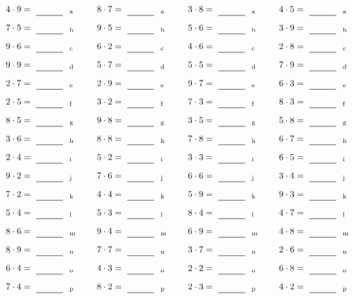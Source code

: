 \documentclass
[
  draft    = true,
  fontsize = 11pt,
  parskip  = half-
]
{scrartcl}
\begin{document}
\par\vfill\par
\begin{align*}
    \pline{4\cdot9}&=\rline{a}
  & \pline{8\cdot7}&=\rline{a}
  & \pline{3\cdot8}&=\rline{a}
  & \pline{4\cdot5}&=\rline{a} \\[1ex]
    \pline{7\cdot5}&=\rline{b}
  & \pline{9\cdot5}&=\rline{b}
  & \pline{5\cdot6}&=\rline{b}
  & \pline{3\cdot9}&=\rline{b} \\[1ex]
    \pline{9\cdot6}&=\rline{c}
  & \pline{6\cdot2}&=\rline{c}
  & \pline{4\cdot6}&=\rline{c}
  & \pline{2\cdot8}&=\rline{c} \\[1ex]
    \pline{9\cdot9}&=\rline{d}
  & \pline{5\cdot7}&=\rline{d}
  & \pline{5\cdot5}&=\rline{d}
  & \pline{7\cdot9}&=\rline{d} \\[1ex]
    \pline{2\cdot7}&=\rline{e}
  & \pline{2\cdot9}&=\rline{e}
  & \pline{9\cdot7}&=\rline{e}
  & \pline{6\cdot3}&=\rline{e} \\[1ex]
    \pline{2\cdot5}&=\rline{f}
  & \pline{3\cdot2}&=\rline{f}
  & \pline{7\cdot3}&=\rline{f}
  & \pline{8\cdot3}&=\rline{f} \\[1ex]
    \pline{8\cdot5}&=\rline{g}
  & \pline{9\cdot8}&=\rline{g}
  & \pline{3\cdot5}&=\rline{g}
  & \pline{5\cdot8}&=\rline{g} \\[1ex]
    \pline{3\cdot6}&=\rline{h}
  & \pline{8\cdot8}&=\rline{h}
  & \pline{7\cdot8}&=\rline{h}
  & \pline{6\cdot7}&=\rline{h} \\[1ex]
    \pline{2\cdot4}&=\rline{i}
  & \pline{5\cdot2}&=\rline{i}
  & \pline{3\cdot3}&=\rline{i}
  & \pline{6\cdot5}&=\rline{i} \\[1ex]
    \pline{9\cdot2}&=\rline{j}
  & \pline{7\cdot6}&=\rline{j}
  & \pline{6\cdot6}&=\rline{j}
  & \pline{3\cdot4}&=\rline{j} \\[1ex]
    \pline{7\cdot2}&=\rline{k}
  & \pline{4\cdot4}&=\rline{k}
  & \pline{5\cdot9}&=\rline{k}
  & \pline{9\cdot3}&=\rline{k} \\[1ex]
    \pline{5\cdot4}&=\rline{l}
  & \pline{5\cdot3}&=\rline{l}
  & \pline{8\cdot4}&=\rline{l}
  & \pline{4\cdot7}&=\rline{l} \\[1ex]
    \pline{8\cdot6}&=\rline{m}
  & \pline{9\cdot4}&=\rline{m}
  & \pline{6\cdot9}&=\rline{m}
  & \pline{4\cdot8}&=\rline{m} \\[1ex]
    \pline{8\cdot9}&=\rline{n}
  & \pline{7\cdot7}&=\rline{n}
  & \pline{3\cdot7}&=\rline{n}
  & \pline{2\cdot6}&=\rline{n} \\[1ex]
    \pline{6\cdot4}&=\rline{o}
  & \pline{4\cdot3}&=\rline{o}
  & \pline{2\cdot2}&=\rline{o}
  & \pline{6\cdot8}&=\rline{o} \\[1ex]
    \pline{7\cdot4}&=\rline{p}
  & \pline{8\cdot2}&=\rline{p}
  & \pline{2\cdot3}&=\rline{p}
  & \pline{4\cdot2}&=\rline{p}
\end{align*}
\end{document}
